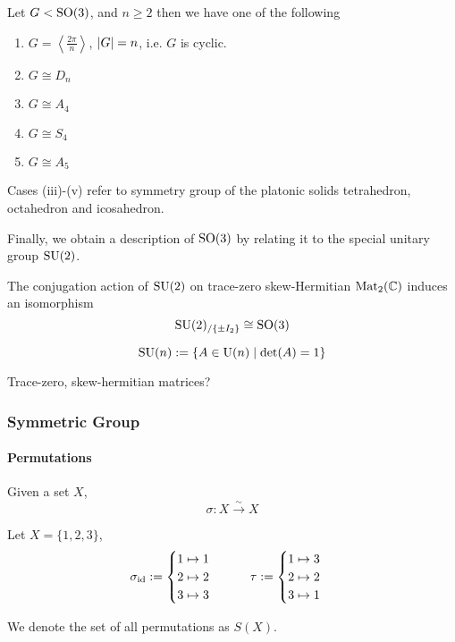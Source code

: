 \begin{theorem}
   Let \(G < \operatorname{SO}(3)\), and \(n \geq 2\) then we have one of the following
   \begin{enumerate}[label=\roman*, align=Center]
      \item \(G = \left\langle \frac{2\pi}{n}\right\rangle\), \(\left\lvert G\right\rvert = n\), i.e. \(G\) is cyclic.
      \item \(G \cong D_n\)
      \item \(G \cong A_4\)
      \item \(G \cong S_4\)
      \item \(G \cong A_5\)
   \end{enumerate}
\end{theorem}
\begin{remark}
   Cases (iii)-(v) refer to symmetry group of the platonic solids tetrahedron, octahedron and icosahedron.
\end{remark}
Finally, we obtain a description of \(\operatorname{SO}(3)\) by relating it to the special unitary group \(\operatorname{SU}(2)\).
\begin{proposition}
   The conjugation action of \(\operatorname{SU}(2)\) on trace-zero skew-Hermitian \(\operatorname{Mat}_2(\mathbb{C})\) induces an isomorphism
   \[\operatorname{SU}(2)_{/\{\pm I_2\}} \cong \operatorname{SO}(3)\]
\end{proposition}

\begin{proposition}
   \[\operatorname{SU}(n) := \{A \in \operatorname{U}(n) \mid \det(A) = 1\}\]
\end{proposition}
\begin{remark}
   Trace-zero, skew-hermitian matrices?
\end{remark}

\subsubsection{Symmetric Group}
\paragraph{Permutations}
\begin{definition}[Permutation]\label{def:permutation}
   Given a set \(X\),
   \[\sigma: X \xrightarrow{\sim} X\]
\end{definition}
\begin{example}
   Let \(X = \{1, 2, 3\}\),
   \[\sigma_{\operatorname{id}} := \begin{cases}1 \mapsto 1\\ 2 \mapsto 2 \\ 3 \mapsto 3 \end{cases} \qquad \tau := \begin{cases}1 \mapsto 3\\ 2 \mapsto 2 \\ 3 \mapsto 1 \end{cases}\]
\end{example}
\begin{remark}[Notation]
   We denote the set of all permutations as \(S(X)\).
\end{remark}

